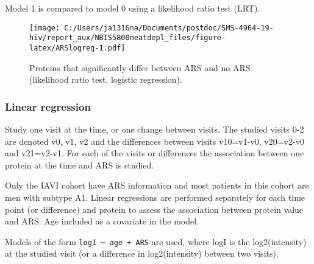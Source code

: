 \documentclass[
]{article}
\begin{document}
Model 1 is compared to model 0 using a likelihood ratio test (LRT).

\begin{figure}
\centering
\texttt{[image: C:/Users/ja1316na/Documents/postdoc/SMS-4964-19-hiv/report\_aux/NBIS5800neatdepl\_files/figure-latex/ARSlogreg-1.pdf]}
\caption{\label{fig:ARSlogreg}Proteins that significantly differ between ARS and no ARS (likelihood ratio test, logistic regression).}
\end{figure}

\FloatBarrier

\hypertarget{linear-regression}{%
\subsubsection{Linear regression}\label{linear-regression}}

Study one visit at the time, or one change between visits. The studied visits 0-2 are denoted v0, v1, v2 and the differences between visits v10=v1-v0, v20=v2-v0 and v21=v2-v1. For each of the visits or differences the association between one protein at the time and ARS is studied.

Only the IAVI cohort have ARS information and most patients in this cohort are men with subtype A1.
Linear regressions are performed separately for each time point (or difference) and protein to assess the association between protein value and ARS. Age included as a covariate in the model.

Models of the form \texttt{logI\ \textasciitilde{}\ age\ +\ ARS} are used, where logI is the log2(intensity) at the studied visit (or a difference in log2(intensity) between two visits).

\FloatBarrier
\end{document}
